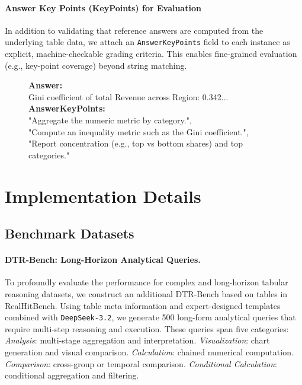 \paragraph{Answer Key Points (KeyPoints) for Evaluation}
\label{sec:keypoints}
In addition to validating that reference answers are computed from the underlying table data, we attach an \texttt{AnswerKeyPoints} field to each instance as explicit, machine-checkable grading criteria. This enables fine-grained evaluation (e.g., key-point coverage) beyond string matching.

\begin{figure}[h]
\begin{tcolorbox}[
    colback=gray!5,
    colframe=gray!60,
    fonttitle=\bfseries,
    boxrule=0.5pt
]
\textbf{Answer:} \\
    Gini coefficient of total Revenue across Region: 0.342... \\
\textbf{AnswerKeyPoints:} \\
    "Aggregate the numeric metric by category.", \\
    "Compute an inequality metric such as the Gini coefficient.", \\
    "Report concentration (e.g., top vs bottom shares) and top categories."
\end{tcolorbox}
\end{figure}



\section{Implementation Details}\label{implement}
\subsection{Benchmark Datasets}
\label{sec:datasets}

\paragraph{DTR-Bench: Long-Horizon Analytical Queries.}
To profoundly evaluate the performance for complex and long-horizon tabular reasoning datasets, we construct an additional DTR-Bench based on tables in RealHitBench. Using table meta information and expert-designed templates combined with \texttt{DeepSeek-3.2}, we generate 500 long-form analytical queries that require multi-step reasoning and execution. These queries span five categories: \textit{Analysis}: multi-stage aggregation and interpretation. \textit{Visualization}: chart generation and visual comparison. \textit{Calculation}: chained numerical computation. \textit{Comparison}: cross-group or temporal comparison. \textit{Conditional Calculation}: conditional aggregation and filtering.

